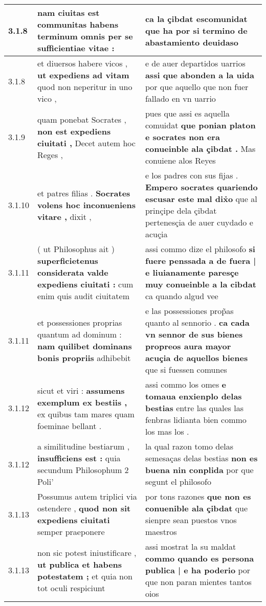 \begin{tabular}{|p{1cm}|p{6.5cm}|p{6.5cm}|}
3.1.8 & nam ciuitas est communitas \textbf{ habens terminum omnis } per se sufficientiae vitae : & ca la çibdat escomunidat \textbf{ que ha } por si termino de abastamiento deuidaso \\\hline
3.1.8 & et diuersos habere vicos , \textbf{ ut expediens ad vitam } quod non neperitur in uno vico , & e de auer departidos uarrios \textbf{ assi que abonden a la uida } por que aquello que non fuer fallado en vn uarrio \\\hline
3.1.9 & quam ponebat Socrates , \textbf{ non est expediens ciuitati , } Decet autem hoc Reges , & pues que assi es aquella comuidat \textbf{ que ponian platon e socrates non era conueinble ala çibdat . } Mas conuiene alos Reyes \\\hline
3.1.10 & et patres filias . \textbf{ Socrates volens hoc inconueniens vitare , } dixit , & e los padres con sus fijas . \textbf{ Empero socrates quariendo escusar este mal dix̉o } que al prinçipe dela çibdat pertenesçia de auer cuydado e acuçia \\\hline
3.1.11 & ( ut Philosophus ait ) \textbf{ superficietenus considerata valde expediens ciuitati : } cum enim quis audit ciuitatem & assi commo dize el philosofo \textbf{ si fuere penssada a de fuera | e liuianamente paresçe muy conueinble a la cibdat } ca quando algud vee \\\hline
3.1.11 & et possessiones proprias quantum ad dominum : \textbf{ nam quilibet dominans bonis propriis } adhibebit & e las possessiones prop̃as quanto al sennorio . \textbf{ ca cada vn sennor de sus bienes propreos aura mayor acuçia de aquellos bienes } que si fuessen comunes \\\hline
3.1.12 & sicut et viri : \textbf{ assumens exemplum ex bestiis , } ex quibus tam mares quam foeminae bellant . & assi commo los omes \textbf{ e tomaua enxienplo delas bestias } entre las quales las fenbras lidianta bien commo los mas los . \\\hline
3.1.12 & a similitudine bestiarum , \textbf{ insufficiens est : } quia secundum Philosophum 2 Poli’ & la qual razon tomo delas semesaças delas bestias \textbf{ non es buena nin conplida } por que segunt el philosofo \\\hline
3.1.13 & Possumus autem triplici via ostendere , \textbf{ quod non sit expediens ciuitati } semper praeponere & por tons razones \textbf{ que non es conuenible ala çibdat } que sienpre sean puestos vnos maestros \\\hline
3.1.13 & non sic potest iniustificare , \textbf{ ut publica et habens potestatem ; } et quia non tot oculi respiciunt & assi mostrat la su maldat \textbf{ commo quando es persona publica | e ha poderio } por que non paran mientes tantos oios \\\hline

\end{tabular}
